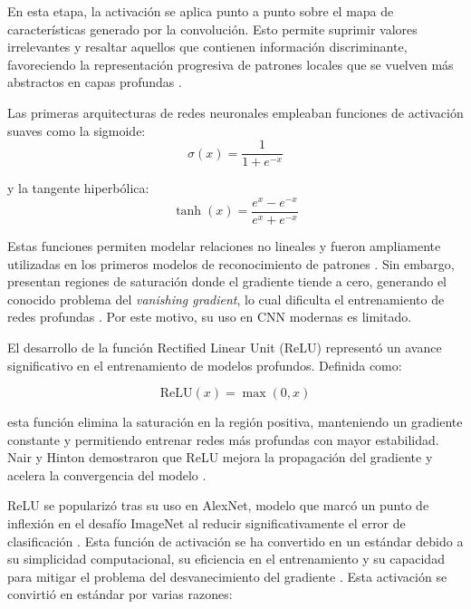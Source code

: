 	En esta etapa, la activación se aplica punto a punto sobre el mapa de características generado por la convolución. Esto permite suprimir valores irrelevantes y resaltar aquellos que contienen información discriminante, favoreciendo la representación progresiva de patrones locales que se vuelven más abstractos en capas profundas \cite{goodfellow2016dl}.
	
	Las primeras arquitecturas de redes neuronales empleaban funciones de activación suaves como la sigmoide:
	\begin{equation}
		\sigma(x) = \frac{1}{1 + e^{-x}}
	\end{equation}
	
	y la tangente hiperbólica:
	\begin{equation}
		\tanh(x) = \frac{e^{x} - e^{-x}}{e^{x} + e^{-x}}
	\end{equation}
	
	Estas funciones permiten modelar relaciones no lineales y fueron ampliamente utilizadas en los primeros modelos de reconocimiento de patrones \cite{haykin1999}. Sin embargo, presentan regiones de saturación donde el gradiente tiende a cero, generando el conocido problema del \textit{vanishing gradient}, lo cual dificulta el entrenamiento de redes profundas \cite{hochreiter1998}. Por este motivo, su uso en CNN modernas es limitado.
	
	El desarrollo de la función Rectified Linear Unit (ReLU) representó un avance significativo en el entrenamiento de modelos profundos. Definida como:
	
	\begin{equation}
		\text{ReLU}(x) = \max(0, x)
	\end{equation}
	
	esta función elimina la saturación en la región positiva, manteniendo un gradiente constante y permitiendo entrenar redes más profundas con mayor estabilidad. Nair y Hinton demostraron que ReLU mejora la propagación del gradiente y acelera la convergencia del modelo \cite{nair2010}.
	
	ReLU se popularizó tras su uso en AlexNet, modelo que marcó un punto de inflexión en el desafío ImageNet al reducir significativamente el error de clasificación \cite{krizhevsky2012alexnet}. Esta función de activación se ha convertido en un estándar debido a su simplicidad computacional, su eficiencia en el entrenamiento y su capacidad para mitigar el problema del desvanecimiento del gradiente \cite{goodfellow2016dl}.  Esta activación se convirtió en estándar por varias razones:
	
